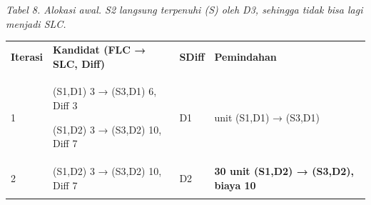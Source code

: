 \documentclass[10pt,a4paper]{article}
\newcounter{none}
\begin{document}
\emph{Tabel 8. Alokasi awal. S2 langsung terpenuhi (S) oleh D3, sehingga
tidak bisa lagi menjadi SLC.}

{\def\LTcaptype{none} %
\begin{longtable}[]{@{}
  >{\raggedright\arraybackslash}p{}
  >{\raggedright\arraybackslash}p{}
  >{\raggedright\arraybackslash}p{}
  >{\raggedright\arraybackslash}p{}@{}}
\toprule\noalign{}
\begin{minipage}[b]{\linewidth}\raggedright
\textbf{Iterasi}
\end{minipage} & \begin{minipage}[b]{\linewidth}\centering
\textbf{Kandidat (FLC → SLC, Diff)}
\end{minipage} & \begin{minipage}[b]{\linewidth}\centering
\textbf{SDiff}
\end{minipage} & \begin{minipage}[b]{\linewidth}\centering
\textbf{Pemindahan}
\end{minipage} \\
\begin{minipage}[b]{\linewidth}\raggedright
1
\end{minipage} & \begin{minipage}[b]{\linewidth}\centering
(S1,D1) 3 → (S3,D1) 6, Diff 3

(S1,D2) 3 → (S3,D2) 10, Diff 7
\end{minipage} & \begin{minipage}[b]{\linewidth}\centering
D1
\end{minipage} & \begin{minipage}[b]{\linewidth}\centering
70 unit (S1,D1) → (S3,D1)
\end{minipage} \\
\begin{minipage}[b]{\linewidth}\raggedright
2
\end{minipage} & \begin{minipage}[b]{\linewidth}\centering
(S1,D2) 3 → (S3,D2) 10, Diff 7
\end{minipage} & \begin{minipage}[b]{\linewidth}\centering
D2
\end{minipage} & \begin{minipage}[b]{\linewidth}\centering
\textbf{30 unit (S1,D2) → (S3,D2), biaya 10}
\end{minipage} \\
\midrule\noalign{}
\endhead
\bottomrule\noalign{}
\endlastfoot
\end{longtable}
}
\end{document}
